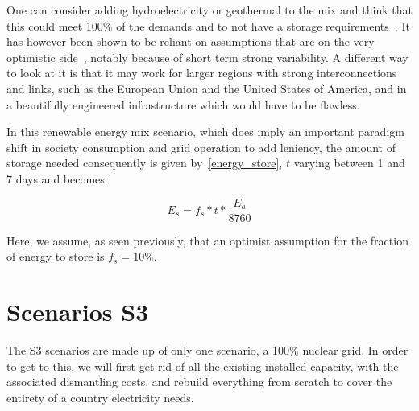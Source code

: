 One can consider adding hydroelectricity or geothermal to the mix and think that this could meet 100\% of the demands and to not have a storage requirements~. It has however been shown to be reliant on assumptions that are on the very optimistic side~, notably because of short term strong variability. A different way to look at it is that it may work for larger regions with strong interconnections and links, such as the European Union and the United States of America, and in a beautifully engineered infrastructure which would have to be flawless.



\begin{remark}

In this renewable energy mix scenario, which does imply an important paradigm shift in society consumption and grid operation to add leniency, the amount of storage needed consequently is given by~\ref{energy_store}, $t$ varying between 1 and 7 days and becomes:

\begin{equation}\label{energy_store}
E_s = f_s * t * \frac{E_a}{8760}
\end{equation}

Here, we assume, as seen previously, that an optimist assumption for the fraction of energy to store is $f_s = 10\%$.


\end{remark}


\section{Scenarios S3}

The S3 scenarios are made up of only one scenario, a 100\% nuclear grid. In order to get to this, we will first get rid of all the existing installed capacity, with the associated dismantling costs, and rebuild everything from scratch to cover the entirety of a country electricity needs.

